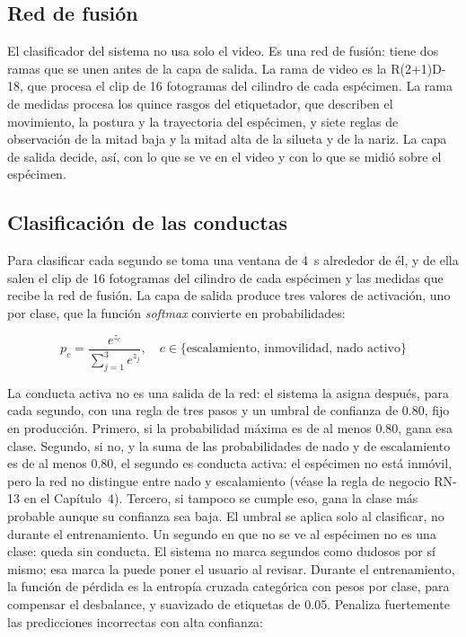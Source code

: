 \subsection{Red de fusión}

El clasificador del sistema no usa solo el video. Es una red de fusión: tiene dos ramas
que se unen antes de la capa de salida. La rama de video es la R(2+1)D-18, que procesa
el clip de 16 fotogramas del cilindro de cada espécimen. La rama de medidas procesa los
quince rasgos del etiquetador, que describen el movimiento, la postura y la trayectoria
del espécimen, y siete reglas de observación de la mitad baja y la mitad alta de la silueta y de la nariz. La capa de
salida decide, así, con lo que se ve en el video y con lo que se midió sobre el
espécimen.

\subsection{Clasificación de las conductas}

Para clasificar cada segundo se toma una ventana de 4~s alrededor de él, y de ella salen
el clip de 16 fotogramas del cilindro de cada espécimen y las medidas que recibe la red
de fusión. La capa de salida produce tres valores de activación, uno por clase, que la
función
\textit{softmax} convierte en probabilidades:

\begin{equation}
    p_c = \frac{e^{z_c}}{\sum_{j=1}^{3} e^{z_j}}, \quad c \in \{\text{escalamiento, inmovilidad, nado activo}\}
    \label{eq:softmax}
\end{equation}

La conducta activa no es una salida de la red: el sistema la asigna después, para cada
segundo, con una regla de tres pasos y un umbral de confianza de 0.80, fijo en
producción. Primero, si la probabilidad máxima es de al menos 0.80, gana esa clase.
Segundo, si no, y la suma de las probabilidades de nado y de escalamiento es de al menos
0.80, el segundo es conducta activa: el espécimen no está inmóvil, pero la red no
distingue entre nado y escalamiento (véase la regla de negocio RN-13 en el Capítulo~4).
Tercero, si tampoco se cumple eso, gana la clase más probable aunque su confianza sea baja.
El umbral se aplica solo al clasificar, no durante el entrenamiento. Un segundo en que no
se ve al espécimen no es una clase: queda sin conducta. El sistema no
marca segundos como dudosos por sí mismo; esa marca la puede poner el usuario al revisar.
Durante el entrenamiento, la función de
pérdida es la entropía cruzada categórica con pesos por clase, para compensar el desbalance, y suavizado de etiquetas de 0.05. Penaliza fuertemente las predicciones incorrectas con alta confianza:

